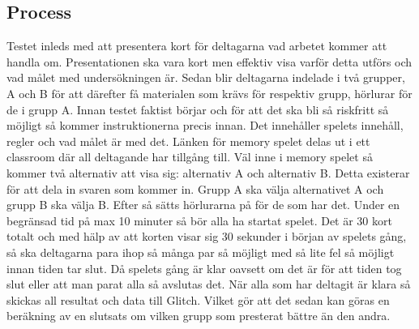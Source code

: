 \documentclass[11p]{article}
\begin{document}
\subsection{Process}
Testet inleds med att presentera kort för deltagarna vad arbetet kommer att handla om.
Presentationen ska vara kort men effektiv visa varför detta utförs och vad målet med undersökningen är.
Sedan blir deltagarna indelade i två grupper, A och B för att därefter få materialen som krävs för respektiv grupp, hörlurar för de i grupp A.
Innan testet faktist börjar och för att det ska bli så riskfritt så möjligt så kommer instruktionerna precis innan.
Det innehåller spelets innehåll, regler och vad målet är med det.
Länken för memory spelet delas ut i ett classroom där all deltagande har tillgång till.
Väl inne i memory spelet så kommer två alternativ att visa sig: alternativ A och alternativ B.
Detta existerar för att dela in svaren som kommer in.
Grupp A ska välja alternativet A och grupp B ska välja B.
\newline Efter så sätts hörlurarna på för de som har det.
Under en begränsad tid på max 10 minuter så bör alla ha startat spelet.
Det är 30 kort totalt och med hälp av att korten visar sig 30 sekunder i början av spelets gång, så ska deltagarna para ihop så många par så möjligt med så lite fel så möjligt innan tiden tar slut.
Då spelets gång är klar oavsett om det är för att tiden tog slut eller att man parat alla så avslutas det.
När alla som har deltagit är klara så skickas all resultat och data till Glitch.
Vilket gör att det sedan kan göras en beräkning av en slutsats om vilken grupp som presterat bättre än den andra.


\printbibliography
\end{document}
